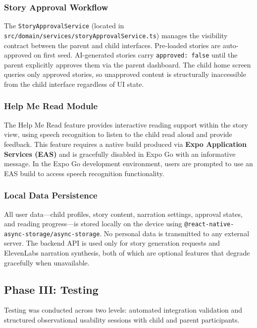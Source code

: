 \subsubsection{Story Approval Workflow}

The \texttt{StoryApprovalService} (located in \texttt{src/domain/services/storyApprovalService.ts}) manages the visibility contract between the parent and child interfaces. Pre-loaded stories are auto-approved on first seed. AI-generated stories carry \texttt{approved: false} until the parent explicitly approves them via the parent dashboard. The child home screen queries only approved stories, so unapproved content is structurally inaccessible from the child interface regardless of UI state.

\subsubsection{Help Me Read Module}

The Help Me Read feature provides interactive reading support within the story view, using speech recognition to listen to the child read aloud and provide feedback. This feature requires a native build produced via \textbf{Expo Application Services (EAS)} and is gracefully disabled in Expo Go with an informative message. In the Expo Go development environment, users are prompted to use an EAS build to access speech recognition functionality.

\subsubsection{Local Data Persistence}

All user data—child profiles, story content, narration settings, approval states, and reading progress—is stored locally on the device using \texttt{@react-native-async-storage/async-storage}. No personal data is transmitted to any external server. The backend API is used only for story generation requests and ElevenLabs narration synthesis, both of which are optional features that degrade gracefully when unavailable.

\subsection{Phase III: Testing}

Testing was conducted across two levels: automated integration validation and structured observational usability sessions with child and parent participants.

